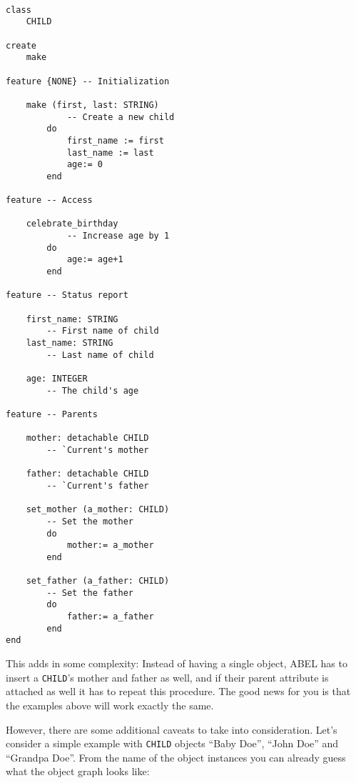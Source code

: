 \begin{lstlisting}[language=OOSC2Eiffel, captionpos=b, caption={The CHILD class}, label={lst:child_class}]

class 
	CHILD

create
	make

feature {NONE} -- Initialization

	make (first, last: STRING)
			-- Create a new child
		do
			first_name := first
			last_name := last
			age:= 0
		end

feature -- Access

	celebrate_birthday
			-- Increase age by 1
		do
			age:= age+1
		end

feature -- Status report

	first_name: STRING
		-- First name of child
	last_name: STRING
		-- Last name of child

	age: INTEGER
		-- The child's age

feature	-- Parents 

	mother: detachable CHILD
		-- `Current's mother

	father: detachable CHILD
		-- `Current's father
	
	set_mother (a_mother: CHILD)
		-- Set the mother
		do
			mother:= a_mother
		end

	set_father (a_father: CHILD)
		-- Set the father
		do
			father:= a_father
		end
end
\end{lstlisting}


This adds in some complexity: 
Instead of having a single object, ABEL has to insert a \lstinline!CHILD!'s mother and father as well, and if their parent attribute is attached as well it has to repeat this procedure.
The good news for you is that the examples above will work exactly the same.

However, there are some additional caveats to take into consideration. 
Let's consider a simple example with \lstinline!CHILD! objects ``Baby Doe'', ``John Doe'' and ``Grandpa Doe''.
From the name of the object instances you can already guess what the object graph looks like: 

	\begin{center}
	\end{center}


